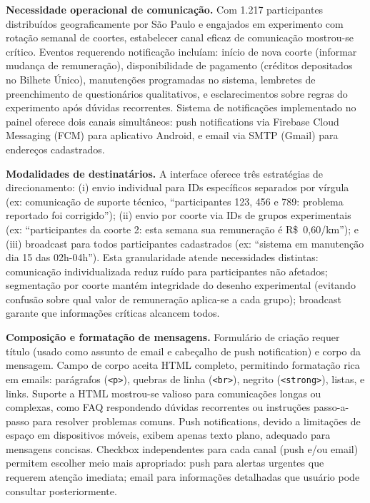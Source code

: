 

\textbf{Necessidade operacional de comunicação.} Com 1.217 participantes distribuídos geograficamente por São Paulo e engajados em experimento com rotação semanal de coortes, estabelecer canal eficaz de comunicação mostrou-se crítico. Eventos requerendo notificação incluíam: início de nova coorte (informar mudança de remuneração), disponibilidade de pagamento (créditos depositados no Bilhete Único), manutenções programadas no sistema, lembretes de preenchimento de questionários qualitativos, e esclarecimentos sobre regras do experimento após dúvidas recorrentes. Sistema de notificações implementado no painel oferece dois canais simultâneos: push notifications via Firebase Cloud Messaging (FCM) para aplicativo Android, e email via SMTP (Gmail) para endereços cadastrados.

\textbf{Modalidades de destinatários.} A interface oferece três estratégias de direcionamento: (i) envio individual para IDs específicos separados por vírgula (ex: comunicação de suporte técnico, ``participantes 123, 456 e 789: problema reportado foi corrigido''); (ii) envio por coorte via IDs de grupos experimentais (ex: ``participantes da coorte 2: esta semana sua remuneração é R\$~0,60/km''); e (iii) broadcast para todos participantes cadastrados (ex: ``sistema em manutenção dia 15 das 02h-04h''). Esta granularidade atende necessidades distintas: comunicação individualizada reduz ruído para participantes não afetados; segmentação por coorte mantém integridade do desenho experimental (evitando confusão sobre qual valor de remuneração aplica-se a cada grupo); broadcast garante que informações críticas alcancem todos.

\textbf{Composição e formatação de mensagens.} Formulário de criação requer título (usado como assunto de email e cabeçalho de push notification) e corpo da mensagem. Campo de corpo aceita HTML completo, permitindo formatação rica em emails: parágrafos (\texttt{<p>}), quebras de linha (\texttt{<br>}), negrito (\texttt{<strong>}), listas, e links. Suporte a HTML mostrou-se valioso para comunicações longas ou complexas, como FAQ respondendo dúvidas recorrentes ou instruções passo-a-passo para resolver problemas comuns. Push notifications, devido a limitações de espaço em dispositivos móveis, exibem apenas texto plano, adequado para mensagens concisas. Checkbox independentes para cada canal (push e/ou email) permitem escolher meio mais apropriado: push para alertas urgentes que requerem atenção imediata; email para informações detalhadas que usuário pode consultar posteriormente.

